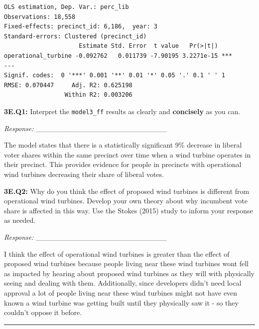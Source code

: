 \documentclass[
  letterpaper,
  DIV=11,
  numbers=noendperiod]{scrartcl}
\begin{document}
\begin{verbatim}
OLS estimation, Dep. Var.: perc_lib
Observations: 18,558
Fixed-effects: precinct_id: 6,186,  year: 3
Standard-errors: Clustered (precinct_id) 
                     Estimate Std. Error  t value   Pr(>|t|)    
operational_turbine -0.092762   0.011739 -7.90195 3.2271e-15 ***
---
Signif. codes:  0 '***' 0.001 '**' 0.01 '*' 0.05 '.' 0.1 ' ' 1
RMSE: 0.070447     Adj. R2: 0.625198
                 Within R2: 0.003206
\end{verbatim}

\textbf{3E.Q1:} Interpret the \texttt{model3\_ff} results as clearly and
\textbf{concisely} as you can.

\emph{Response:} \_\_\_\_\_\_\_\_\_\_\_\_\_\_\_\_\_\_\_\_\_\_\_\_\_

The model states that there is a statistically significant 9\% decrease
in liberal voter shares within the same precinct over time when a wind
turbine operates in their precinct. This provides evidence for people in
precincts with operational wind turbines decreasing their share of
liberal votes.

\textbf{3E.Q2:} Why do you think the effect of proposed wind turbines is
different from operational wind turbines. Develop your own theory about
why incumbent vote share is affected in this way. Use the Stokes (2015)
study to inform your response as needed.

\emph{Response:} \_\_\_\_\_\_\_\_\_\_\_\_\_\_\_\_\_\_\_\_\_\_\_\_\_

I think the effect of operational wind turbines is greater than the
effect of proposed wind turbines because people living near these wind
turbines wont fell as impacted by hearing about proposed wind turbines
as they will with physically seeing and dealing with them. Additionally,
since developers didn't need local approval a lot of people living near
these wind turbines might not have even known a wind turbine was getting
built until they physically saw it - so they couldn't oppose it before.

\begin{center}\rule{0.5\linewidth}{0.5pt}\end{center}
\end{document}
